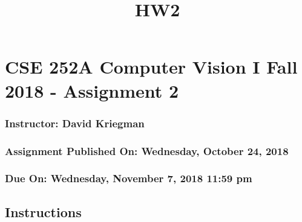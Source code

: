 \documentclass[11pt]{article}
\title{HW2}
\begin{document}
    
    
    \maketitle
    
    

    
    \hypertarget{cse-252a-computer-vision-i-fall-2018---assignment-2}{%
\section{CSE 252A Computer Vision I Fall 2018 - Assignment
2}\label{cse-252a-computer-vision-i-fall-2018---assignment-2}}

\hypertarget{instructor-david-kriegman}{%
\subsubsection{Instructor: David
Kriegman}\label{instructor-david-kriegman}}

\hypertarget{assignment-published-on-wednesday-october-24-2018}{%
\subsubsection{Assignment Published On: Wednesday, October 24,
2018}\label{assignment-published-on-wednesday-october-24-2018}}

\hypertarget{due-on-wednesday-november-7-2018-1159-pm}{%
\subsubsection{Due On: Wednesday, November 7, 2018 11:59
pm}\label{due-on-wednesday-november-7-2018-1159-pm}}

\hypertarget{instructions}{%
\subsection{Instructions}\label{instructions}}
\end{document}
